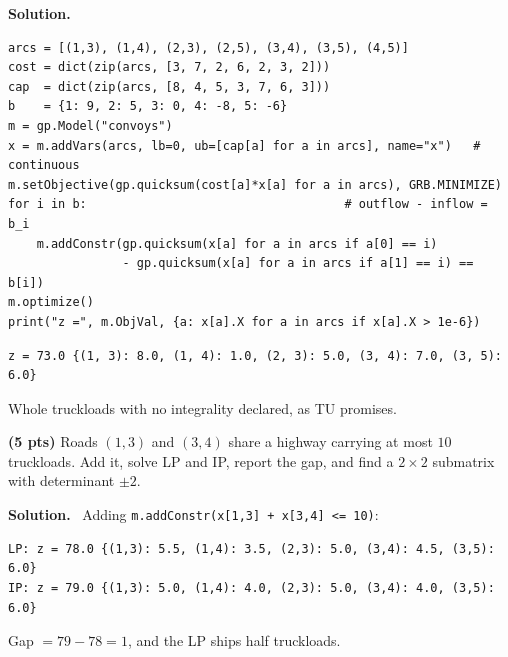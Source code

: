 \documentclass[10pt]{article}
\newenvironment{solution}
  {\par\smallskip\begingroup\color{solink}\textbf{Solution.}\ }
  {\endgroup\par}
\begin{document}
\begin{parts}
\begin{solution}
\begin{lstlisting}
arcs = [(1,3), (1,4), (2,3), (2,5), (3,4), (3,5), (4,5)]
cost = dict(zip(arcs, [3, 7, 2, 6, 2, 3, 2]))
cap  = dict(zip(arcs, [8, 4, 5, 3, 7, 6, 3]))
b    = {1: 9, 2: 5, 3: 0, 4: -8, 5: -6}
m = gp.Model("convoys")
x = m.addVars(arcs, lb=0, ub=[cap[a] for a in arcs], name="x")   # continuous
m.setObjective(gp.quicksum(cost[a]*x[a] for a in arcs), GRB.MINIMIZE)
for i in b:                                    # outflow - inflow = b_i
    m.addConstr(gp.quicksum(x[a] for a in arcs if a[0] == i)
                - gp.quicksum(x[a] for a in arcs if a[1] == i) == b[i])
m.optimize()
print("z =", m.ObjVal, {a: x[a].X for a in arcs if x[a].X > 1e-6})
\end{lstlisting}
\begin{lstlisting}
z = 73.0 {(1, 3): 8.0, (1, 4): 1.0, (2, 3): 5.0, (3, 4): 7.0, (3, 5): 6.0}
\end{lstlisting}
Whole truckloads with no integrality declared, as TU promises.
\end{solution}

\item \textbf{(5 pts)} Roads $(1,3)$ and $(3,4)$ share a highway carrying at most $10$
  truckloads. Add it, solve LP and IP, report the gap, and find a $2\times2$ submatrix with
  determinant $\pm 2$.

\begin{solution}
Adding \texttt{m.addConstr(x[1,3] + x[3,4] <= 10)}:
\begin{lstlisting}
LP: z = 78.0 {(1,3): 5.5, (1,4): 3.5, (2,3): 5.0, (3,4): 4.5, (3,5): 6.0}
IP: z = 79.0 {(1,3): 5.0, (1,4): 4.0, (2,3): 5.0, (3,4): 4.0, (3,5): 6.0}
\end{lstlisting}
Gap $= 79 - 78 = 1$, and the LP ships half truckloads.


\end{solution}
\end{parts}
\end{document}
